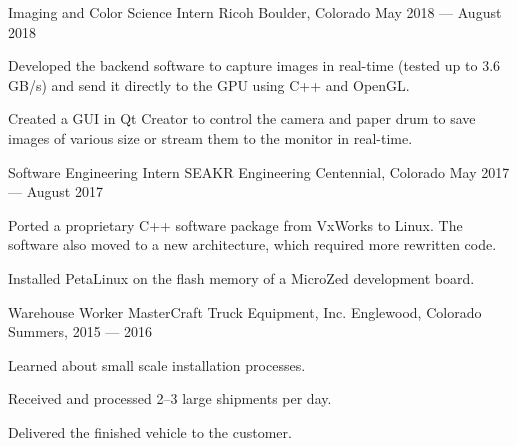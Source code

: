 \begin{cventries}
  \cventry%
    {Imaging and Color Science Intern}
    {Ricoh}
    {Boulder, Colorado}
    {May 2018 --- August 2018}
    {%
      \begin{cvitems}
         \item Developed the backend software to capture images in real-time
               (tested up to 3.6 GB/s) and send it directly to the GPU using C++
               and OpenGL.\@
         \item Created a GUI in Qt Creator to control the camera and paper drum to save
               images of various size or stream them to the monitor in real-time.
      \end{cvitems}
    }
  \cventry%
    {Software Engineering Intern}
    {SEAKR Engineering}
    {Centennial, Colorado}
    {May 2017 --- August 2017}
    {%
      \begin{cvitems}
         \item Ported a proprietary C++ software package from VxWorks to Linux.
         The software also moved to a new architecture, which required more
         rewritten code.
         \item Installed PetaLinux on the flash memory of a MicroZed development board.
      \end{cvitems}
    }
  \cventry%
    {Warehouse Worker}
    {MasterCraft Truck Equipment, Inc.}
    {Englewood, Colorado}
    {Summers, 2015 --- 2016}
    {%
      \begin{cvitems}
         \item Learned about small scale installation processes.
         \item Received and processed 2--3 large shipments per day.
         \item Delivered the finished vehicle to the customer.
      \end{cvitems}
    }
\end{cventries}
